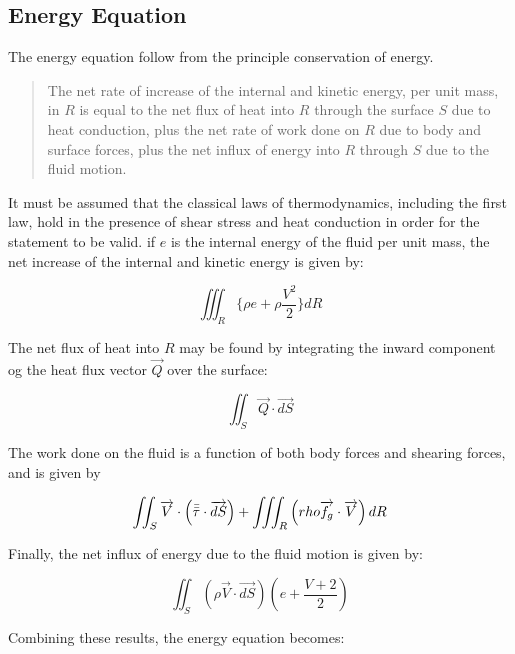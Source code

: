 \subsection{Energy Equation}

The energy equation follow from the principle conservation of energy.

\begin{quote} 
  The net rate of increase of the internal and kinetic energy, per
  unit mass, in $R$ is equal to the net flux of heat into $R$ through the
  surface $S$ due to heat conduction, plus the net rate of work done on $R$ due
  to body and surface forces, plus the net influx of energy into $R$ through
  $S$ due to the fluid motion.  
\end{quote}

It must be assumed that the classical   laws of thermodynamics, including the
first law, hold in the presence of shear stress and heat conduction in order
for the statement to be valid. if $e$ is the internal energy of the fluid per
unit mass, the net increase of the internal and kinetic energy is given by:

\begin{equation}
  \iiint_R\{\rho e + \rho \frac{V^2}{2}\} dR
\end{equation}

The net flux of heat into $R$ may be found by integrating the inward component
og the heat flux vector $\overrightarrow{Q}$ over the surface:

\begin{equation}
  \iint_S\overrightarrow{Q}\cdot\overrightarrow{dS}
\end{equation}

The work done on the fluid is a function of both body forces and shearing
forces, and is given by

\begin{equation}
  \iint_S\overrightarrow{V} \cdot\left(\bar{\bar{\tau}}\cdot\overrightarrow{dS}\right) 
  + \iiint_R\left(rho \overrightarrow{f_g}\cdot\overrightarrow{V}\right)dR
\end{equation}

Finally, the net influx of energy due to the fluid motion is given by:

\begin{equation}
  \iint_S\left(\rho\overrightarrow{V}\cdot\overrightarrow{dS}\right)\left(e 
  + \frac{V+2}{2}\right)
\end{equation}

Combining these results, the energy equation becomes:

